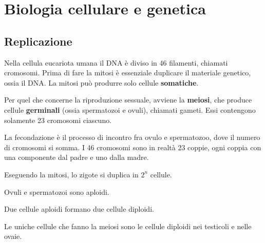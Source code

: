 \documentclass[a4paper]{article}
\begin{document}


\pagebreak

\section{Biologia cellulare e genetica}

\subsection{Replicazione}

Nella cellula eucariota umana il DNA è diviso in 46 filamenti, chiamati cromosomi.
Prima di fare la mitosi è essenziale duplicare il materiale genetico, ossia il DNA.
La mitosi può produrre solo cellule \textbf{somatiche}.

Per quel che concerne la riproduzione sessuale,
avviene la \textbf{meiosi}, che produce cellule \textbf{germinali}
(ossia spermatozoi e ovuli), chiamati gameti.
Essi contengono solamente 23 cromosomi ciascuno.

La fecondazione è il processo di incontro fra ovulo e spermatozoo,
dove il numero di cromosomi si somma.
I 46 cromosomi sono in realtà 23 coppie, ogni coppia con una componente dal padre e uno dalla madre.

Eseguendo la mitosi, lo zigote si duplica in \(2^n\) cellule.

Ovuli e spermatozoi sono aploidi.

Due cellule aploidi formano due cellule diploidi.

Le uniche cellule che fanno la meiosi sono le cellule diploidi nei testicoli e nelle ovaie.

\end{document}
